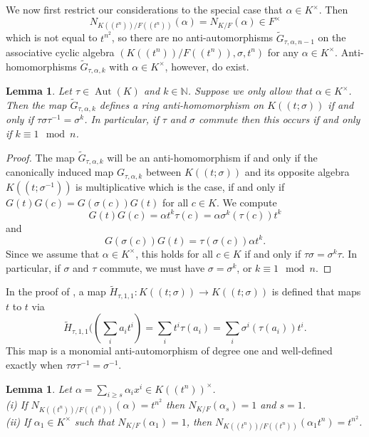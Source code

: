 \documentclass{amsart}
\theoremstyle{plain}
\newtheorem{lemma}[theorem]{Lemma}
\theoremstyle{definition}
\numberwithin{equation}{section}
\numberwithin{figure}{section}
\newcommand{\N}{\mathbb{N}}
\DeclareMathOperator{\Aut}{Aut}
\begin{document}
We now first restrict our considerations to the special case that $\alpha\in K^\times$. Then
$$N_{K((t^n))/F((t^n))}(\alpha)=
N_{K/F}(\alpha)\in F^\times$$
 which is not equal to $t^{n^2}$, so there are no anti-automorphisms $\widetilde G_{\tau,\alpha,n-1}$ on the associative cyclic algebra $(K((t^n))/F((t^n)),\sigma, t^n)$ for any  $\alpha\in K^\times$.
Anti-homomorphisms $\widetilde G_{\tau,\alpha,k}$ with $\alpha\in K^\times$, however, do exist.

\begin{lemma}\label{le:Ktsigmatoitself}
    Let $\tau\in \Aut(K)$ and $k\in \N$. Suppose we only allow  that $\alpha\in K^\times$.  Then the map $\widetilde G_{\tau,\alpha,k}$
     defines a ring anti-homomorphism on $K((t;\sigma))$  if and only if $\tau\sigma\tau^{-1}=\sigma^k$.
     In particular, if $\tau$ and $\sigma$ commute then this occurs if and only if $k\equiv 1 \mod n$.
\end{lemma}


\begin{proof}
The map $\widetilde G_{\tau,\alpha,k}$
  will be an anti-homomorphism if and only if  the canonically induced  map $G_{\tau,\alpha,k}$ between $ K((t;\sigma))$ and its opposite algebra $ K((t;\sigma^{-1}))$ is multiplicative which is the case, if and only if  $G(t)G(c)=G(\sigma(c))G(t)$ for all $c\in K$.
 We compute
$$
G(t)G(c)=\alpha t^{k} \tau(c) = \alpha \sigma^{k}(\tau(c)) t^{k}
$$
and
$$
G(\sigma(c))G(t)=\tau(\sigma(c))\alpha t^{k}.
$$
Since we assume that $\alpha\in K^\times$, this holds for all $c\in K$ if and only if $\tau\sigma=\sigma^{k}\tau$.
 In particular, if $\sigma$ and $\tau$ commute, we must have $\sigma=\sigma^{k}$, or  $k\equiv 1 \mod n$.
\end{proof}



In the proof of \cite[Theorem 4.4]{MST},  a map $\widetilde H_{\tau,1,1}:K((t;\sigma))\to K((t;\sigma))$ is defined that maps $t$ to $t$ via
$$\widetilde H_{\tau,1,1}((\sum_{i} a_i t^i) = \sum_{i}  t^{i}\tau(a_i)=\sum_{i} \sigma^i(\tau(a_i))  t^{i}.
$$
This map is a monomial anti-automorphism of degree one and well-defined exactly when $\tau\sigma\tau^{-1}=\sigma^{-1}$. 

 \begin{lemma}
 Let $\alpha=\sum_{i\geq s}\alpha_ix^i\in K((t^n))^\times$.
 \\ (i) If $N_{K((t^n))/F((t^n))}(\alpha)=t^{n^2}$ then $N_{K/F}(\alpha_s)=1$ and $s=1$.
 \\ (ii) If $\alpha_1\in K^\times$ such that $N_{K/F}(\alpha_1)=1$, then $N_{K((t^n))/F((t^n))}(\alpha_1 t^n)=t^{n^2}$.
 \end{lemma}
\end{document}
